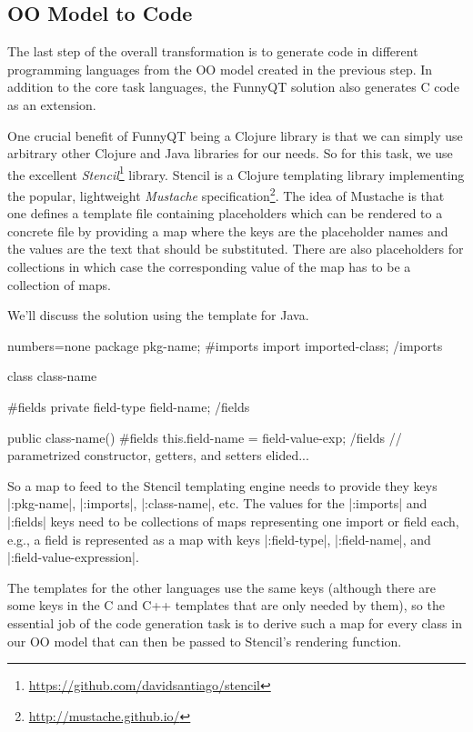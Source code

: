 \documentclass[submission]{eptcs}
\newcommand{\code}{\clojureinline}
\begin{document}
\subsection{OO Model to Code}
\label{sec:oo-model-to-code}

The last step of the overall transformation is to generate code in different
programming languages from the OO model created in the previous step.  In
addition to the core task languages, the FunnyQT solution also generates C code
as an extension.

One crucial benefit of FunnyQT being a Clojure library is that we can simply
use arbitrary other Clojure and Java libraries for our needs.  So for this
task, we use the excellent
\emph{Stencil}\footnote{\url{https://github.com/davidsantiago/stencil}}
library.  Stencil is a Clojure templating library implementing the popular,
lightweight \emph{Mustache}
specification\footnote{\url{http://mustache.github.io/}}.  The idea of Mustache
is that one defines a template file containing placeholders which can be
rendered to a concrete file by providing a map where the keys are the
placeholder names and the values are the text that should be substituted.
There are also placeholders for collections in which case the corresponding
value of the map has to be a collection of maps.

We'll discuss the solution using the template for Java.

\begin{javacode*}{numbers=none}
package {{{pkg-name}}};
{{#imports}}
import {{{imported-class}}};
{{/imports}}

class {{{class-name}}} {
    {{#fields}}
    private {{{field-type}}} {{{field-name}}};
    {{/fields}}

    public {{{class-name}}}() {
	{{#fields}}
	this.{{{field-name}}} = {{{field-value-exp}}};
	{{/fields}}
    }
    // parametrized constructor, getters, and setters elided...
}
\end{javacode*}

So a map to feed to the Stencil templating engine needs to provide they keys
\code|:pkg-name|, \code|:imports|, \code|:class-name|, etc.  The values for the
\code|:imports| and \code|:fields| keys need to be collections of maps
representing one import or field each, e.g., a field is represented as a map
with keys \code|:field-type|, \code|:field-name|, and
\code|:field-value-expression|.

The templates for the other languages use the same keys (although there are
some keys in the C and C++ templates that are only needed by them), so the
essential job of the code generation task is to derive such a map for every
class in our OO model that can then be passed to Stencil's rendering function.
\end{document}
